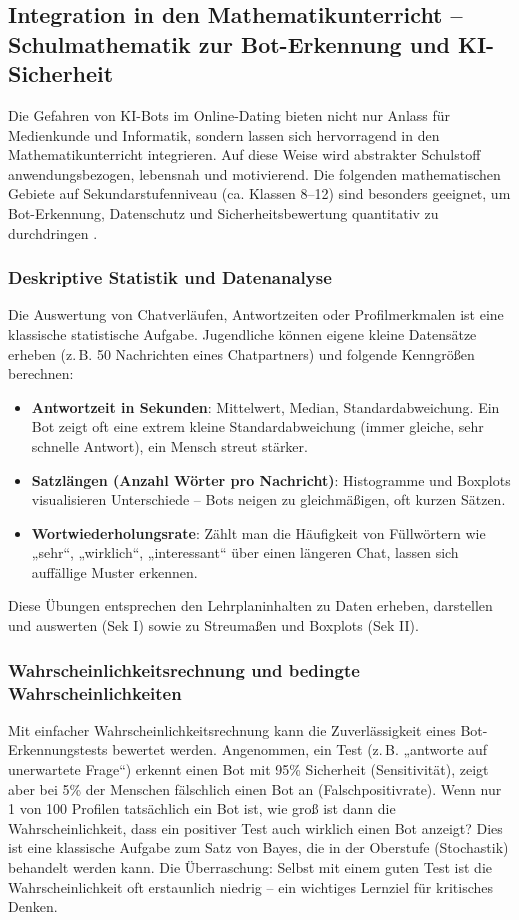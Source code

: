 \documentclass[12pt,a4paper,oneside]{scrartcl}
\begin{document}
	\subsection{Integration in den Mathematikunterricht – Schulmathematik zur Bot-Erkennung und KI-Sicherheit}
	
	Die Gefahren von KI-Bots im Online-Dating bieten nicht nur Anlass für Medienkunde und Informatik, sondern lassen sich hervorragend in den Mathematikunterricht integrieren. Auf diese Weise wird abstrakter Schulstoff anwendungsbezogen, lebensnah und motivierend. Die folgenden mathematischen Gebiete auf Sekundarstufenniveau (ca. Klassen 8–12) sind besonders geeignet, um Bot-Erkennung, Datenschutz und Sicherheitsbewertung quantitativ zu durchdringen \cite{Fachdidaktik2025, Maier2026}.
	
	\subsubsection{Deskriptive Statistik und Datenanalyse}
	
	Die Auswertung von Chatverläufen, Antwortzeiten oder Profilmerkmalen ist eine klassische statistische Aufgabe. Jugendliche können eigene kleine Datensätze erheben (z.\,B. 50 Nachrichten eines Chatpartners) und folgende Kenngrößen berechnen:
	\begin{itemize}
		\item \textbf{Antwortzeit in Sekunden}: Mittelwert, Median, Standardabweichung. Ein Bot zeigt oft eine extrem kleine Standardabweichung (immer gleiche, sehr schnelle Antwort), ein Mensch streut stärker.
		\item \textbf{Satzlängen (Anzahl Wörter pro Nachricht)}: Histogramme und Boxplots visualisieren Unterschiede – Bots neigen zu gleichmäßigen, oft kurzen Sätzen.
		\item \textbf{Wortwiederholungsrate}: Zählt man die Häufigkeit von Füllwörtern wie „sehr“, „wirklich“, „interessant“ über einen längeren Chat, lassen sich auffällige Muster erkennen.
	\end{itemize}
	Diese Übungen entsprechen den Lehrplaninhalten zu Daten erheben, darstellen und auswerten (Sek I) sowie zu Streumaßen und Boxplots (Sek II).
	
	\subsubsection{Wahrscheinlichkeitsrechnung und bedingte Wahrscheinlichkeiten}
	
	Mit einfacher Wahrscheinlichkeitsrechnung kann die Zuverlässigkeit eines Bot-Erkennungstests bewertet werden. Angenommen, ein Test (z.\,B. „antworte auf unerwartete Frage“) erkennt einen Bot mit 95\% Sicherheit (Sensitivität), zeigt aber bei 5\% der Menschen fälschlich einen Bot an (Falschpositivrate). Wenn nur 1 von 100 Profilen tatsächlich ein Bot ist, wie groß ist dann die Wahrscheinlichkeit, dass ein positiver Test auch wirklich einen Bot anzeigt? Dies ist eine klassische Aufgabe zum Satz von Bayes, die in der Oberstufe (Stochastik) behandelt werden kann. Die Überraschung: Selbst mit einem guten Test ist die Wahrscheinlichkeit oft erstaunlich niedrig – ein wichtiges Lernziel für kritisches Denken.
	
\end{document}
